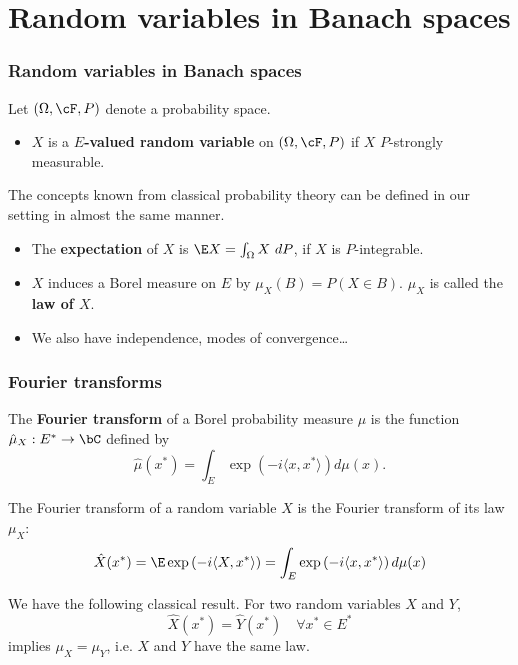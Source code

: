 \section{Random variables in Banach spaces}


\begin{frame}
    \frametitle{Random variables in Banach spaces}
    
    Let $(\Omega, \cF, P)$ denote a probability space.

    \begin{itemize}
        \item $X$ is a \textbf{$E$-valued random variable} on $(\Omega, \cF, P)$ if $X$
            $P$-strongly measurable. 
    \end{itemize} 

    The concepts known from classical probability theory can be defined in our
    setting in almost the same manner.

    \begin{itemize}
        \item The \textbf{expectation} of $X$ is $\E X= \int_{\Omega}^{} X \ dP$, if $X$ 
            is $P$-integrable.
        \item $X$ induces a Borel measure on $E$ by $\mu_X(B) = P(X \in B)$. $\mu_X$
            is called the \textbf{law of $X$}. 
        \item We also have independence, modes of convergence\ldots
    \end{itemize}

\end{frame}


\begin{frame}
    \frametitle{Fourier transforms}
   
    The \textbf{Fourier transform} of a Borel probability measure $\mu$ is the function
    $\hat \mu_X : E^*\to \bC$ defined by
    \begin{equation*}
        \hat \mu(x^*) = \int_{E}^{} \exp\left( -i \langle x , x^* \rangle \right) d \mu(x).
    \end{equation*}
    
    The Fourier transform of a random variable $X$ is the Fourier transform of its 
    law $\mu_X$: 
    \begin{equation*}
        \hat X(x^*) = \E \exp \left( -i \langle X, x^* \rangle \right) 
        = \int_{E}^{} \exp\left( -i \langle x , x^* \rangle \right) d \mu(x)
    \end{equation*}
    
    We have the following classical result. For two random variables $X$ and $Y$,
    \begin{equation*}
        \hat X (x^*) = \hat Y (x^*) \quad \forall x^* \in E^*
    \end{equation*}
    implies $\mu_X = \mu_Y$, i.e. $X$ and $Y$ have the same law.
    
\end{frame}

